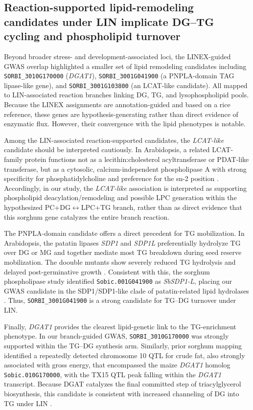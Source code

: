 \documentclass[9pt,twocolumn,twoside]{rilabRxiv}
\begin{document}
\subsection{Reaction-supported lipid-remodeling candidates under LIN implicate DG--TG cycling and phospholipid turnover}

Beyond broader stress- and development-associated loci, the LINEX-guided GWAS overlap highlighted a smaller set of lipid remodeling candidates including \texttt{SORBI\_3010G170000} (\textit{DGAT1}), \texttt{SORBI\_3001G041900} (a PNPLA-domain TAG lipase-like gene), and \texttt{SORBI\_3001G103800} (an LCAT-like candidate). All mapped to LIN-associated reaction branches linking DG, TG, and lysophospholipid pools. Because the LINEX assignments are annotation-guided and based on a rice reference, these genes are hypothesis-generating rather than direct evidence of enzymatic flux. However, their convergence with the lipid phenotypes is notable.

Among the LIN-associated reaction-supported candidates, the \textit{LCAT-like} candidate should be interpreted cautiously. In Arabidopsis, a related LCAT-family protein functions not as a lecithin:cholesterol acyltransferase or PDAT-like transferase, but as a cytosolic, calcium-independent phospholipase A with strong specificity for phosphatidylcholine and preference for the sn-2 position \citep{Chen2012}. Accordingly, in our study, the \textit{LCAT-like} association is interpreted as supporting phospholipid deacylation/remodeling and possible LPC generation within the hypothesized PC+DG$\leftrightarrow$LPC+TG branch, rather than as direct evidence that this sorghum gene catalyzes the entire branch reaction.

The PNPLA-domain candidate offers a direct precedent for TG mobilization. In Arabidopsis, the patatin lipases \textit{SDP1} and \textit{SDP1L} preferentially hydrolyze TG over DG or MG and together mediate most TG breakdown during seed reserve mobilization. The doouble mutants show severely reduced TG hydrolysis and delayed post-germinative growth \citep{Kelly2011SDP1L}. Consistent with this, the sorghum phospholipase study identified \texttt{Sobic.001G041900} as \textit{SbSDP1-L}, placing our GWAS candidate in the SDP1/SDP1-like clade of patatin-related lipid hydrolases \citep{Sapara2024PLA}. Thus, \texttt{SORBI\_3001G041900} is a strong candidate for TG–DG turnover under LIN.

Finally, \textit{DGAT1} provides the clearest lipid-genetic link to the TG-enrichment phenotype. In our branch-guided GWAS, \texttt{SORBI\_3010G170000} was strongly supported within the TG--DG synthesis arm. Similarly, prior sorghum mapping identified a repeatedly detected chromosome 10 QTL for crude fat, also strongly associated with gross energy, that encompassed the maize \textit{DGAT1} homolog \texttt{Sobic.010G170000}, with the TX15 QTL peak falling within the \textit{DGAT1} transcript. Because DGAT catalyzes the final committed step of triacylglycerol biosynthesis, this candidate is consistent with increased channeling of DG into TG under LIN \citep{Boyles2017DGAT1,Yen2008DGAT}.
\end{document}
